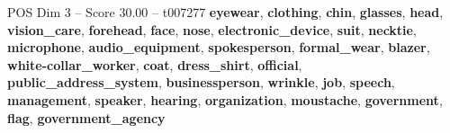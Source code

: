 \begin{textsample}{POS Dim 3 – Score 30.00 – t007277}  \label{ex:f3_pos_037}
\textbf{eyewear}, \textbf{clothing}, \textbf{chin}, \textbf{glasses}, \textbf{head}, \textbf{vision\_care}, \textbf{forehead}, \textbf{face}, \textbf{nose}, \textbf{electronic\_device}, \textbf{suit}, \textbf{necktie}, \textbf{microphone}, \textbf{audio\_equipment}, \textbf{spokesperson}, \textbf{formal\_wear}, \textbf{blazer}, \textbf{white-collar\_worker}, \textbf{coat}, \textbf{dress\_shirt}, \textbf{official}, \textbf{public\_address\_system}, \textbf{businessperson}, \textbf{wrinkle}, \textbf{job}, \textbf{speech}, \textbf{management}, \textbf{speaker}, \textbf{hearing}, \textbf{organization}, \textbf{moustache}, \textbf{government}, \textbf{flag}, \textbf{government\_agency}

\end{textsample}
